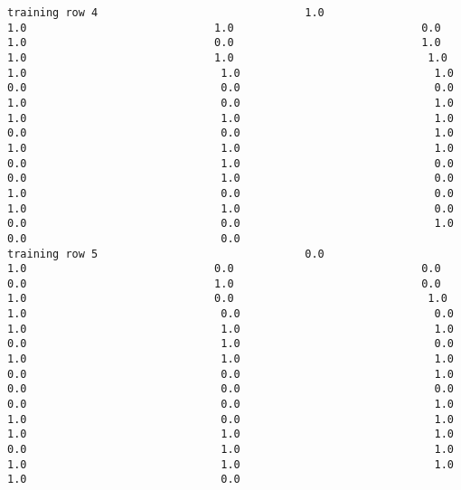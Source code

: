 \documentclass[11pt]{article}
\begin{document}
\begin{verbatim}
training row 4                                1.0                             1.0                             1.0                             0.0                             1.0                             0.0                             1.0                             1.0                             1.0                              1.0                              1.0                              1.0                              1.0                              0.0                              0.0                              0.0                              1.0                              0.0                              1.0                              1.0                              1.0                              1.0                              0.0                              0.0                              1.0                              1.0                              1.0                              1.0                              0.0                              1.0                              0.0                              0.0                              1.0                              0.0                              1.0                              0.0                              0.0                              1.0                              1.0                              0.0                              0.0                              0.0                              1.0                              0.0                              0.0
training row 5                                0.0                             1.0                             0.0                             0.0                             0.0                             1.0                             0.0                             1.0                             0.0                              1.0                              1.0                              0.0                              0.0                              1.0                              1.0                              1.0                              0.0                              1.0                              0.0                              1.0                              1.0                              1.0                              0.0                              0.0                              1.0                              0.0                              0.0                              0.0                              0.0                              0.0                              1.0                              1.0                              0.0                              1.0                              1.0                              1.0                              1.0                              0.0                              1.0                              1.0                              1.0                              1.0                              1.0                              1.0                              0.0

\end{verbatim}
\end{document}

